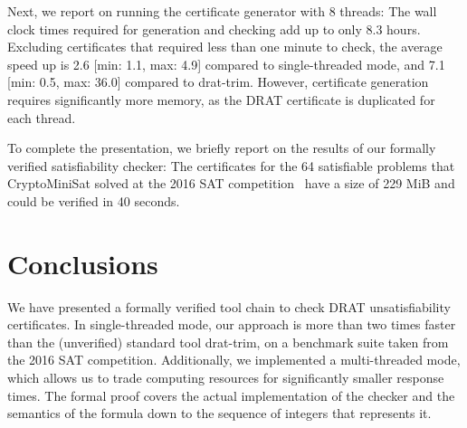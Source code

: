 \documentclass[smallcondensed]{svjour3}     %
\begin{document}
Next, we report on running the certificate generator with 8 threads: The wall clock times required for generation and checking add up to only 8.3 hours.
Excluding certificates that required less than one minute to check, the average speed up is 2.6 [min: 1.1, max: 4.9] compared to single-threaded mode, 
and 7.1 [min: 0.5, max: 36.0] compared to drat-trim.
However, certificate generation requires significantly more memory, as the DRAT certificate is duplicated for each thread.
 


To complete the presentation, we briefly report on the results of our formally verified satisfiability checker:
The certificates for the 64 satisfiable problems that CryptoMiniSat solved at the 2016 SAT competition~\cite{satcomp-2016} have a size of 229 MiB and could be verified in 40 seconds.

\section{Conclusions}\label{sec:concl}
We have presented a formally verified tool chain to check DRAT unsatisfiability certificates. 
In single-threaded mode, our approach is more than two times faster than the (unverified) standard tool drat-trim, on a benchmark 
suite taken from the 2016 SAT competition. Additionally, we implemented a multi-threaded mode, 
which allows us to trade computing resources for significantly smaller response times.
The formal proof covers the actual implementation of the checker and the semantics of the 
formula down to the sequence of integers that represents it.
\end{document}
